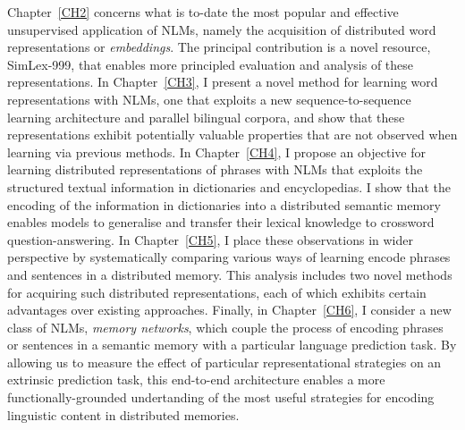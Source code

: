 Chapter~\ref{CH2} concerns what is to-date the most popular and effective unsupervised application of NLMs, namely the acquisition of distributed word representations or \emph{embeddings}. The principal contribution is a novel resource, SimLex-999, that enables more principled evaluation and analysis of these representations. In Chapter~\ref{CH3}, I present a novel method for learning word representations with NLMs, one that exploits a new sequence-to-sequence learning architecture and parallel bilingual corpora, and show that these representations exhibit potentially valuable properties that are not observed when learning via previous methods. In Chapter~\ref{CH4}, I propose an objective for learning distributed representations of phrases with NLMs that exploits the structured textual information in dictionaries and encyclopedias. I show that the encoding of the information in dictionaries into a distributed semantic memory enables models to generalise and transfer their lexical knowledge to crossword question-answering. In Chapter~\ref{CH5}, I place these observations in wider perspective by systematically comparing various ways of learning encode phrases and sentences in a distributed memory. This analysis includes two novel methods for acquiring such distributed representations, each of which exhibits certain advantages over existing approaches. Finally, in Chapter~\ref{CH6}, I consider a new class of NLMs, \emph{memory networks}, which couple the process of encoding phrases or sentences in a semantic memory with a particular language prediction task. By allowing us to measure the effect of particular representational strategies on an extrinsic prediction task, this end-to-end architecture enables a more functionally-grounded undertanding of the most useful strategies for encoding linguistic content in distributed memories. 

